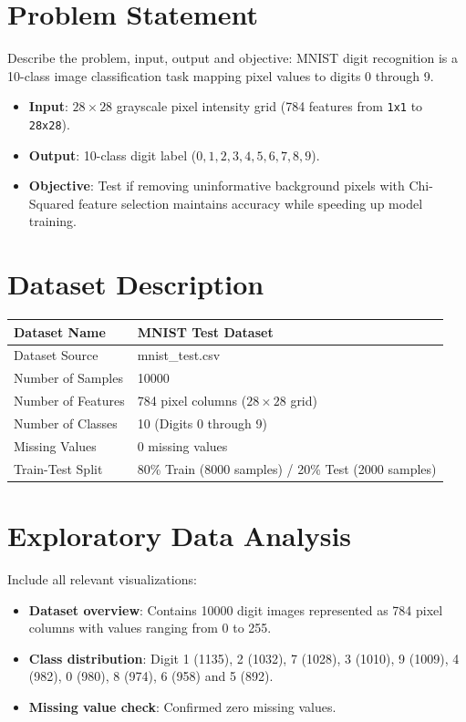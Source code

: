 \documentclass[12pt,a4paper]{article}
\begin{document}
\section{Problem Statement}
Describe the problem, input, output and objective:
MNIST digit recognition is a 10-class image classification task mapping pixel values to digits 0 through 9.
\begin{itemize}
\item \textbf{Input}: $28 \times 28$ grayscale pixel intensity grid (784 features from \texttt{1x1} to \texttt{28x28}).
\item \textbf{Output}: 10-class digit label ($0, 1, 2, 3, 4, 5, 6, 7, 8, 9$).
\item \textbf{Objective}: Test if removing uninformative background pixels with Chi-Squared feature selection maintains accuracy while speeding up model training.
\end{itemize}

\section{Dataset Description}
\begin{longtable}{|p{6cm}|p{8cm}|}
\hline
Dataset Name & MNIST Test Dataset \\ \hline
Dataset Source & mnist\_test.csv \\ \hline
Number of Samples & 10000 \\ \hline
Number of Features & 784 pixel columns ($28 \times 28$ grid) \\ \hline
Number of Classes & 10 (Digits 0 through 9) \\ \hline
Missing Values & 0 missing values \\ \hline
Train-Test Split & 80\% Train (8000 samples) / 20\% Test (2000 samples) \\ \hline
\end{longtable}

\section{Exploratory Data Analysis}
Include all relevant visualizations:
\begin{itemize}
\item \textbf{Dataset overview}: Contains 10000 digit images represented as 784 pixel columns with values ranging from 0 to 255.
\item \textbf{Class distribution}: Digit 1 (1135), 2 (1032), 7 (1028), 3 (1010), 9 (1009), 4 (982), 0 (980), 8 (974), 6 (958) and 5 (892).
\item \textbf{Missing value check}: Confirmed zero missing values.
\end{itemize}
\end{document}
